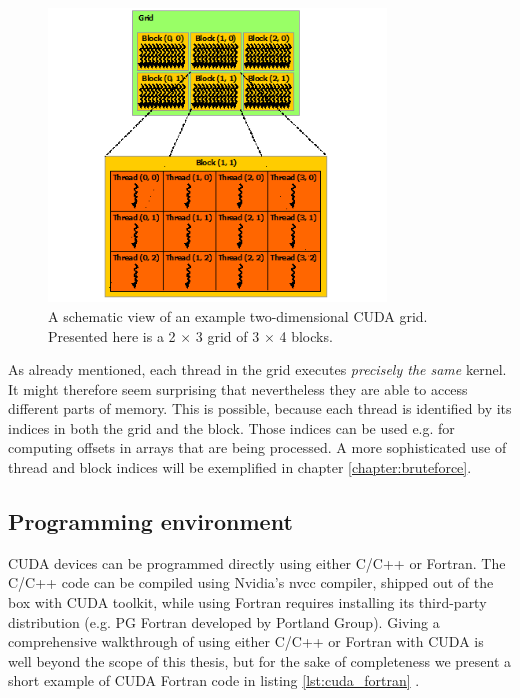 \begin{figure}[ht]
    \centering
    \includegraphics[width=0.8\textwidth]{figures/grid-of-thread-blocks.png}
    \caption{{\protect {}} A schematic view of an example two-dimensional CUDA grid. Presented here is a 2 $\times$ 3 grid of 3 $\times$ 4 blocks.}
    \label{fig:cuda_grid}
\end{figure}

As already mentioned, each thread in the grid executes \emph{precisely the same} kernel. It might therefore seem surprising that nevertheless they are able to access different parts of memory. This is possible, because each thread is identified by its indices in both the grid and the block. Those indices can be used e.g. for computing offsets in arrays that are being processed. A more sophisticated use of thread and block indices will be exemplified in chapter \ref{chapter:bruteforce}.

\subsection{Programming environment}
CUDA devices can be programmed directly using either C/C++ or Fortran. The C/C++ code can be compiled using Nvidia's nvcc compiler, shipped out of the box with CUDA toolkit, while using Fortran requires installing its third-party distribution (e.g. PG Fortran developed by Portland Group). Giving a comprehensive walkthrough of using either C/C++ or Fortran with CUDA is well beyond the scope of this thesis, but for the sake of completeness we present a short example of CUDA Fortran code in listing \ref{lst:cuda_fortran} . 

